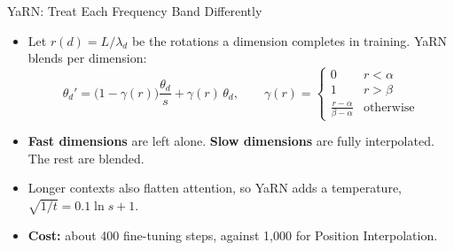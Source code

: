 \begin{frame}{YaRN: Treat Each Frequency Band Differently}
    \begin{itemize}\itemsep0.29em
        \item Let $r(d)=L/\lambda_d$ be the rotations a dimension completes in training. YaRN blends per dimension:
        \[
            \theta_d' = \big(1-\gamma(r)\big)\frac{\theta_d}{s} + \gamma(r)\,\theta_d,
            \qquad
            \gamma(r)=\begin{cases}0 & r<\alpha\\ 1 & r>\beta\\ \frac{r-\alpha}{\beta-\alpha} & \text{otherwise}\end{cases}
        \]
        \item \textbf{Fast dimensions} are left alone. \textbf{Slow dimensions} are fully interpolated. The rest are blended.
        \item Longer contexts also flatten attention, so YaRN adds a temperature, $\sqrt{1/t}=0.1\ln s+1$.
        \item \textbf{Cost:} about 400 fine-tuning steps, against 1,000 for Position Interpolation.
    \end{itemize}
    \vspace{0.13em}
\end{frame}

